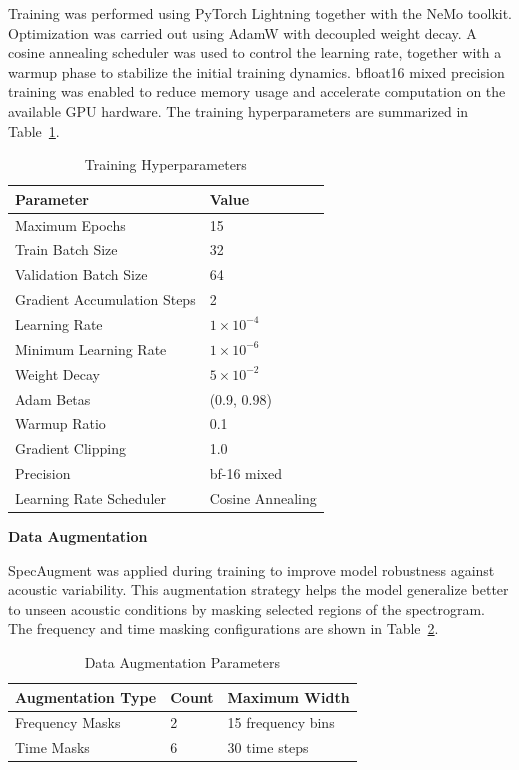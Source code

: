 Training was performed using PyTorch Lightning together with the NeMo toolkit. Optimization was carried out using AdamW with decoupled weight decay. A cosine annealing scheduler was used to control the learning rate, together with a warmup phase to stabilize the initial training dynamics. bfloat16 mixed precision training was enabled to reduce memory usage and accelerate computation on the available GPU hardware. The training hyperparameters are summarized in Table~\ref{tab:fastconformer_train}.

\begin{table}[H]
\caption{Training Hyperparameters}
\label{tab:fastconformer_train}
\centering
\begin{tabular}{|l|l|}
\hline
\textbf{Parameter} & \textbf{Value} \\
\hline
Maximum Epochs & 15 \\
Train Batch Size & 32 \\
Validation Batch Size & 64 \\
Gradient Accumulation Steps & 2 \\
Learning Rate & $1\times10^{-4}$ \\
Minimum Learning Rate & $1\times10^{-6}$ \\
Weight Decay & $5\times10^{-2}$ \\
Adam Betas & (0.9, 0.98) \\
Warmup Ratio & 0.1 \\
Gradient Clipping & 1.0 \\
Precision & bf-16 mixed\\
Learning Rate Scheduler & Cosine Annealing \\
\hline
\end{tabular}
\end{table}

\textbf{Data Augmentation}

SpecAugment was applied during training to improve model robustness against acoustic variability. This augmentation strategy helps the model generalize better to unseen acoustic conditions by masking selected regions of the spectrogram. The frequency and time masking configurations are shown in Table~\ref{tab:fastconformer_aug}.

\begin{table}[H]
\caption{Data Augmentation Parameters}
\label{tab:fastconformer_aug}
\centering
\begin{tabular}{|l|l|l|}
\hline
\textbf{Augmentation Type} & \textbf{Count} & \textbf{Maximum Width} \\
\hline
Frequency Masks & 2 & 15 frequency bins \\
Time Masks & 6 & 30 time steps \\
\hline
\end{tabular}
\end{table}

